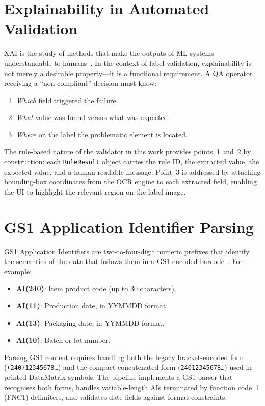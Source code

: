 \section{Explainability in Automated Validation}

\ac{XAI} is the study of methods that make the outputs of \ac{ML} systems understandable
to humans~\cite{adadi2018peeking}. In the context of label validation, explainability is
not merely a desirable property—it is a functional requirement. A QA operator receiving a
``non-compliant'' decision must know:

\begin{enumerate}
  \item \textit{Which} field triggered the failure.
  \item \textit{What} value was found versus what was expected.
  \item \textit{Where} on the label the problematic element is located.
\end{enumerate}

The rule-based nature of the validator in this work provides points~1 and~2 by construction:
each \texttt{RuleResult} object carries the rule ID, the extracted value, the expected value,
and a human-readable message. Point~3 is addressed by attaching bounding-box coordinates
from the \ac{OCR} engine to each extracted field, enabling the \ac{UI} to highlight the
relevant region on the label image.

\section{GS1 Application Identifier Parsing}

GS1 Application Identifiers are two-to-four-digit numeric prefixes that identify the semantics
of the data that follows them in a GS1-encoded barcode~\cite{gs12023general}. For example:
\begin{itemize}
  \item \textbf{AI(240)}: Item product code (up to 30 characters).
  \item \textbf{AI(11)}: Production date, in YYMMDD format.
  \item \textbf{AI(13)}: Packaging date, in YYMMDD format.
  \item \textbf{AI(10)}: Batch or lot number.
\end{itemize}

Parsing GS1 content requires handling both the legacy bracket-encoded form
(\texttt{(240)12345678\ldots}) and the compact concatenated form
(\texttt{24012345678\ldots}) used in printed DataMatrix symbols. The pipeline implements
a GS1 parser that recognises both forms, handles variable-length AIs terminated by
function code~1 (FNC1) delimiters, and validates date fields against format constraints.
